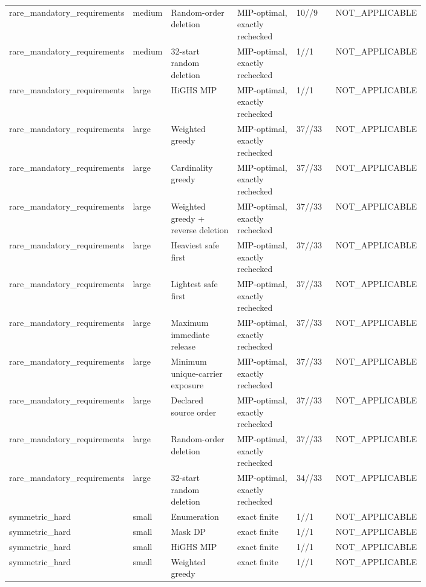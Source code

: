 {\begin{longtable}{p{0.18\linewidth}p{0.07\linewidth}p{0.17\linewidth}p{0.16\linewidth}p{0.10\linewidth}p{0.12\linewidth}}
rare\_mandatory\_requirements & medium & Random-order deletion & MIP-optimal, exactly rechecked & 10//9 & NOT\_APPLICABLE \\
rare\_mandatory\_requirements & medium & 32-start random deletion & MIP-optimal, exactly rechecked & 1//1 & NOT\_APPLICABLE \\
rare\_mandatory\_requirements & large & HiGHS MIP & MIP-optimal, exactly rechecked & 1//1 & NOT\_APPLICABLE \\
rare\_mandatory\_requirements & large & Weighted greedy & MIP-optimal, exactly rechecked & 37//33 & NOT\_APPLICABLE \\
rare\_mandatory\_requirements & large & Cardinality greedy & MIP-optimal, exactly rechecked & 37//33 & NOT\_APPLICABLE \\
rare\_mandatory\_requirements & large & Weighted greedy + reverse deletion & MIP-optimal, exactly rechecked & 37//33 & NOT\_APPLICABLE \\
rare\_mandatory\_requirements & large & Heaviest safe first & MIP-optimal, exactly rechecked & 37//33 & NOT\_APPLICABLE \\
rare\_mandatory\_requirements & large & Lightest safe first & MIP-optimal, exactly rechecked & 37//33 & NOT\_APPLICABLE \\
rare\_mandatory\_requirements & large & Maximum immediate release & MIP-optimal, exactly rechecked & 37//33 & NOT\_APPLICABLE \\
rare\_mandatory\_requirements & large & Minimum unique-carrier exposure & MIP-optimal, exactly rechecked & 37//33 & NOT\_APPLICABLE \\
rare\_mandatory\_requirements & large & Declared source order & MIP-optimal, exactly rechecked & 37//33 & NOT\_APPLICABLE \\
rare\_mandatory\_requirements & large & Random-order deletion & MIP-optimal, exactly rechecked & 37//33 & NOT\_APPLICABLE \\
rare\_mandatory\_requirements & large & 32-start random deletion & MIP-optimal, exactly rechecked & 34//33 & NOT\_APPLICABLE \\
symmetric\_hard & small & Enumeration & exact finite & 1//1 & NOT\_APPLICABLE \\
symmetric\_hard & small & Mask DP & exact finite & 1//1 & NOT\_APPLICABLE \\
symmetric\_hard & small & HiGHS MIP & exact finite & 1//1 & NOT\_APPLICABLE \\
symmetric\_hard & small & Weighted greedy & exact finite & 1//1 & NOT\_APPLICABLE \\

\end{longtable}}
